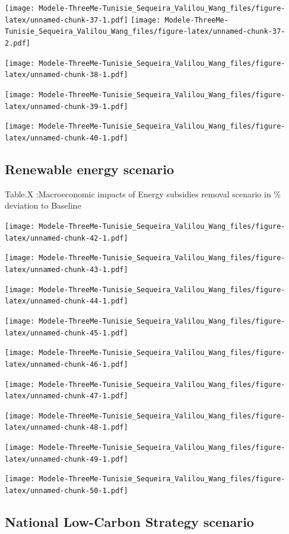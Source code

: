 \documentclass[
]{article}
\begin{document}
\texttt{[image: Modele-ThreeMe-Tunisie\_Sequeira\_Valilou\_Wang\_files/figure-latex/unnamed-chunk-37-1.pdf]}
\texttt{[image: Modele-ThreeMe-Tunisie\_Sequeira\_Valilou\_Wang\_files/figure-latex/unnamed-chunk-37-2.pdf]}

\texttt{[image: Modele-ThreeMe-Tunisie\_Sequeira\_Valilou\_Wang\_files/figure-latex/unnamed-chunk-38-1.pdf]}

\texttt{[image: Modele-ThreeMe-Tunisie\_Sequeira\_Valilou\_Wang\_files/figure-latex/unnamed-chunk-39-1.pdf]}

\texttt{[image: Modele-ThreeMe-Tunisie\_Sequeira\_Valilou\_Wang\_files/figure-latex/unnamed-chunk-40-1.pdf]}

\hypertarget{renewable-energy-scenario-1}{%
\subsection{Renewable energy
scenario}\label{renewable-energy-scenario-1}}

Table.X :Macroeconomic impacts of Energy subsidies removal scenario in
\% deviation to Baseline

\texttt{[image: Modele-ThreeMe-Tunisie\_Sequeira\_Valilou\_Wang\_files/figure-latex/unnamed-chunk-42-1.pdf]}

\texttt{[image: Modele-ThreeMe-Tunisie\_Sequeira\_Valilou\_Wang\_files/figure-latex/unnamed-chunk-43-1.pdf]}

\texttt{[image: Modele-ThreeMe-Tunisie\_Sequeira\_Valilou\_Wang\_files/figure-latex/unnamed-chunk-44-1.pdf]}

\texttt{[image: Modele-ThreeMe-Tunisie\_Sequeira\_Valilou\_Wang\_files/figure-latex/unnamed-chunk-45-1.pdf]}

\texttt{[image: Modele-ThreeMe-Tunisie\_Sequeira\_Valilou\_Wang\_files/figure-latex/unnamed-chunk-46-1.pdf]}

\texttt{[image: Modele-ThreeMe-Tunisie\_Sequeira\_Valilou\_Wang\_files/figure-latex/unnamed-chunk-47-1.pdf]}

\texttt{[image: Modele-ThreeMe-Tunisie\_Sequeira\_Valilou\_Wang\_files/figure-latex/unnamed-chunk-48-1.pdf]}

\texttt{[image: Modele-ThreeMe-Tunisie\_Sequeira\_Valilou\_Wang\_files/figure-latex/unnamed-chunk-49-1.pdf]}

\texttt{[image: Modele-ThreeMe-Tunisie\_Sequeira\_Valilou\_Wang\_files/figure-latex/unnamed-chunk-50-1.pdf]}

\hypertarget{national-low-carbon-strategy-scenario-1}{%
\subsection{National Low-Carbon Strategy
scenario}\label{national-low-carbon-strategy-scenario-1}}
\end{document}
